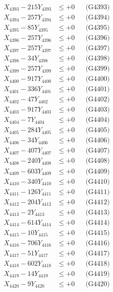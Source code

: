\documentclass[a4paper,10pt]{article}
\begin{document}
{\begin{align}
X_{4393} - 215Y_{4393} &\leq +0 && \text{(G4393)} \\
X_{4394} - 257Y_{4394} &\leq +0 && \text{(G4394)} \\
X_{4395} - 85Y_{4395} &\leq +0 && \text{(G4395)} \\
X_{4396} - 257Y_{4396} &\leq +0 && \text{(G4396)} \\
X_{4397} - 257Y_{4397} &\leq +0 && \text{(G4397)} \\
X_{4398} - 34Y_{4398} &\leq +0 && \text{(G4398)} \\
X_{4399} - 257Y_{4399} &\leq +0 && \text{(G4399)} \\
X_{4400} - 917Y_{4400} &\leq +0 && \text{(G4400)} \\
\allowbreak
X_{4401} - 336Y_{4401} &\leq +0 && \text{(G4401)} \\
X_{4402} - 47Y_{4402} &\leq +0 && \text{(G4402)} \\
X_{4403} - 917Y_{4403} &\leq +0 && \text{(G4403)} \\
X_{4404} - 7Y_{4404} &\leq +0 && \text{(G4404)} \\
X_{4405} - 284Y_{4405} &\leq +0 && \text{(G4405)} \\
X_{4406} - 34Y_{4406} &\leq +0 && \text{(G4406)} \\
X_{4407} - 407Y_{4407} &\leq +0 && \text{(G4407)} \\
X_{4408} - 240Y_{4408} &\leq +0 && \text{(G4408)} \\
X_{4409} - 603Y_{4409} &\leq +0 && \text{(G4409)} \\
X_{4410} - 340Y_{4410} &\leq +0 && \text{(G4410)} \\
\allowbreak
X_{4411} - 126Y_{4411} &\leq +0 && \text{(G4411)} \\
X_{4412} - 204Y_{4412} &\leq +0 && \text{(G4412)} \\
X_{4413} - 2Y_{4413} &\leq +0 && \text{(G4413)} \\
X_{4414} - 614Y_{4414} &\leq +0 && \text{(G4414)} \\
X_{4415} - 10Y_{4415} &\leq +0 && \text{(G4415)} \\
X_{4416} - 706Y_{4416} &\leq +0 && \text{(G4416)} \\
X_{4417} - 51Y_{4417} &\leq +0 && \text{(G4417)} \\
X_{4418} - 602Y_{4418} &\leq +0 && \text{(G4418)} \\
X_{4419} - 14Y_{4419} &\leq +0 && \text{(G4419)} \\
X_{4420} - 9Y_{4420} &\leq +0 && \text{(G4420)} \\

\end{align}}
\end{document}
